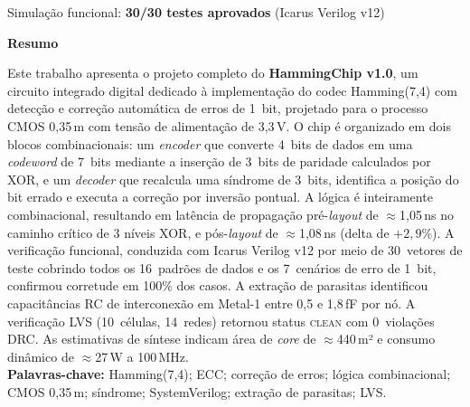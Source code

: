 \documentclass[12pt,a4paper]{article}
\begin{document}
\begin{center}

  \vfill
  {\small\textcolor{bwgray}{Simulação funcional: \textbf{30/30 testes aprovados} (Icarus Verilog v12)}}
\end{center}

\newpage

\begin{center}
  {\large\bfseries\color{bwblack} Resumo}
\end{center}
\begin{unidadebox}[Resumo]
Este trabalho apresenta o projeto completo do \textbf{HammingChip v1.0}, um circuito integrado digital dedicado à implementação do codec Hamming(7,4) com detecção e correção automática de erros de 1~bit, projetado para o processo CMOS 0,35\,\textmu m com tensão de alimentação de 3,3\,V. O chip é organizado em dois blocos combinacionais: um \textit{encoder} que converte 4~bits de dados em uma \textit{codeword} de 7~bits mediante a inserção de 3~bits de paridade calculados por XOR, e um \textit{decoder} que recalcula uma síndrome de 3~bits, identifica a posição do bit errado e executa a correção por inversão pontual. A lógica é inteiramente combinacional, resultando em latência de propagação pré-\textit{layout} de $\approx$1,05\,ns no caminho crítico de 3 níveis XOR, e pós-\textit{layout} de $\approx$1,08\,ns (delta de $+2{,}9$\%). A verificação funcional, conduzida com Icarus Verilog v12 por meio de 30~vetores de teste cobrindo todos os 16~padrões de dados e os 7~cenários de erro de 1~bit, confirmou corretude em 100\% dos casos. A extração de parasitas identificou capacitâncias RC de interconexão em Metal-1 entre 0,5 e 1,8\,fF por nó. A verificação LVS (10~células, 14~redes) retornou status \textsc{clean} com 0~violações DRC. As estimativas de síntese indicam área de \textit{core} de $\approx$440\,\textmu m² e consumo dinâmico de $\approx$27\,\textmu W a 100\,MHz.\\[4pt]
\textbf{Palavras-chave:} Hamming(7,4); ECC; correção de erros; lógica combinacional; CMOS 0,35\,\textmu m; síndrome; SystemVerilog; extração de parasitas; LVS.
\end{unidadebox}
\end{document}
